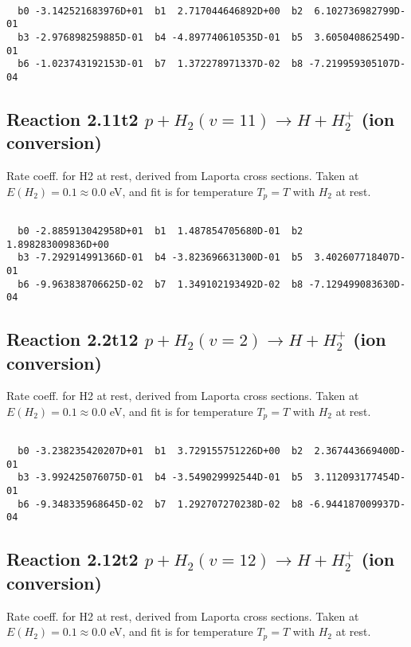 \begin{small}\begin{verbatim}

  b0 -3.142521683976D+01  b1  2.717044646892D+00  b2  6.102736982799D-01
  b3 -2.976898259885D-01  b4 -4.897740610535D-01  b5  3.605040862549D-01
  b6 -1.023743192153D-01  b7  1.372278971337D-02  b8 -7.219959305107D-04

\end{verbatim}\end{small}

\newpage
\subsection{
Reaction 2.11t2
$ p + H_2(v=11) \rightarrow H + H_2^+$ (ion conversion)
}
Rate coeff. for H2 at rest, derived from Laporta cross sections.
Taken at $E(H_2) = 0.1 \approx 0.0$ eV,  and fit is for temperature $T_p=T$ with $H_2$ at rest.

\begin{small}\begin{verbatim}

  b0 -2.885913042958D+01  b1  1.487854705680D-01  b2  1.898283009836D+00
  b3 -7.292914991366D-01  b4 -3.823696631300D-01  b5  3.402607718407D-01
  b6 -9.963838706625D-02  b7  1.349102193492D-02  b8 -7.129499083630D-04

\end{verbatim}\end{small}

\newpage
\subsection{
Reaction 2.2t12
$ p + H_2(v=2) \rightarrow H + H_2^+$ (ion conversion)
}
Rate coeff. for H2 at rest, derived from Laporta cross sections.
Taken at $E(H_2) = 0.1 \approx 0.0$ eV,  and fit is for temperature $T_p=T$ with $H_2$ at rest.

\begin{small}\begin{verbatim}

  b0 -3.238235420207D+01  b1  3.729155751226D+00  b2  2.367443669400D-01
  b3 -3.992425076075D-01  b4 -3.549029992544D-01  b5  3.112093177454D-01
  b6 -9.348335968645D-02  b7  1.292707270238D-02  b8 -6.944187009937D-04

\end{verbatim}\end{small}

\newpage
\subsection{
Reaction 2.12t2
$ p + H_2(v=12) \rightarrow H + H_2^+$ (ion conversion)
}
Rate coeff. for H2 at rest, derived from Laporta cross sections.
Taken at $E(H_2) = 0.1 \approx 0.0$ eV,  and fit is for temperature $T_p=T$ with $H_2$ at rest.

